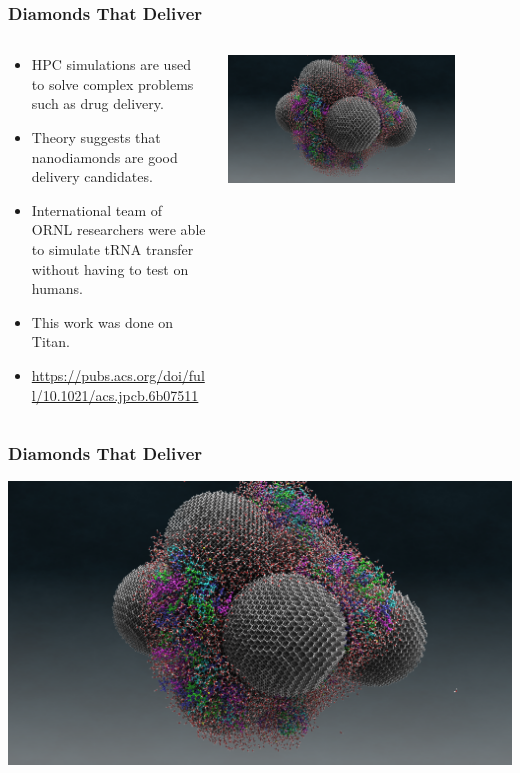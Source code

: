 \begin{frame}
\frametitle{Diamonds That Deliver}
\begin{columns}
    \begin{column}{0.5\paperwidth}
    \begin{itemize}
        \item HPC simulations are used to solve complex problems such as drug
        delivery.
        \item Theory suggests that nanodiamonds are good delivery candidates.
        \item International team of ORNL researchers were able to simulate tRNA transfer without
        having to test on humans.
        \item This work was done on Titan.
        \item
        \href{https://pubs.acs.org/doi/full/10.1021/acs.jpcb.6b07511}{https://pubs.acs.org/doi/full/10.1021/acs.jpcb.6b07511}
    \end{itemize}
    \end{column}
    \begin{column}{0.5\paperwidth}
        \center\includegraphics[width=0.8\textwidth]{NanoDiamond.png}
    \end{column}
\end{columns}
\end{frame}

\begin{frame}
\frametitle{Diamonds That Deliver}
\center\includegraphics[width=\textwidth]{NanoDiamond.png}
\end{frame}

